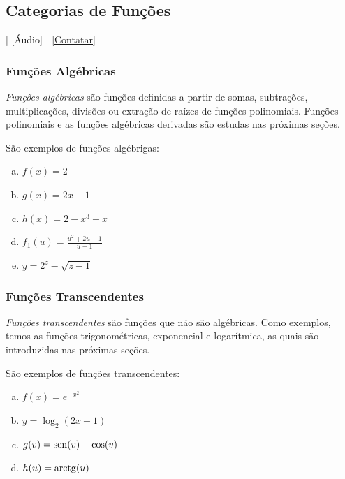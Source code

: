 \subsection{Categorias de Funções}

\begin{flushright}
  [Vídeo] | [Áudio] | \href{https://phkonzen.github.io/notas/contato.html}{[Contatar]}
\end{flushright}

\subsubsection{Funções Algébricas}

\emph{Funções algébricas} são funções definidas a partir de somas, subtrações, multiplicações, divisões ou extração de raízes de funções polinomiais. Funções polinomiais e as funções algébricas derivadas são estudas nas próximas seções.

\begin{ex}
  São exemplos de funções algébrigas:
  \begin{enumerate}[a)]
  \item $\displaystyle f(x) = 2$
  \item $\displaystyle g(x) = 2x - 1$
  \item $\displaystyle h(x) = 2 - x^3 + x$
  \item $\displaystyle f_1(u) = \frac{u^2 + 2u + 1}{u - 1}$
  \item $\displaystyle y = 2^z - \sqrt{z - 1}$
  \end{enumerate}
\end{ex}

\subsubsection{Funções Transcendentes}

\emph{Funções transcendentes} são funções que não são algébricas. Como exemplos, temos as funções trigonométricas, exponencial e logarítmica, as quais são introduzidas nas próximas seções.

\begin{ex}
  São exemplos de funções transcendentes:
  \begin{enumerate}[a)]
  \item $\displaystyle f(x) = e^{-x^2}$
  \item $\displaystyle y = \log_2(2x - 1)$
  \item $\displaystyle g(v) = \operatorname{sen}(v) - \cos(v)$
  \item $\displaystyle h(u) = \operatorname{arctg}(u)$
  \end{enumerate}
\end{ex}

